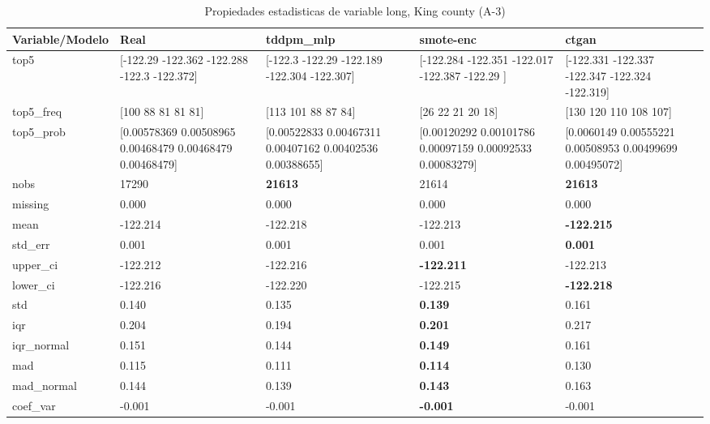 \begin{table}[H]
\centering
\fontsize{8}{14}\selectfont
\caption{Propiedades  estadisticas de variable long, King county (A-3)}
\label{table-stats-king county-a-3-long}
\begin{tabular}{|l|m{10em}|m{10em}|m{10em}|m{10em}|}
\hline
 \rowcolor[gray]{0.8}
Variable/Modelo & Real & tddpm\_mlp & smote-enc & ctgan \\
\hline top5 & [-122.29  -122.362 -122.288 -122.3   -122.372] & [-122.3   -122.29  -122.189 -122.304 -122.307] & [-122.284 -122.351 -122.017 -122.387 -122.29 ] & [-122.331 -122.337 -122.347 -122.324 -122.319] \\
\hline top5\_freq & [100  88  81  81  81] & [113 101  88  87  84] & [26 22 21 20 18] & [130 120 110 108 107] \\
\hline top5\_prob & [0.00578369 0.00508965 0.00468479 0.00468479 0.00468479] & [0.00522833 0.00467311 0.00407162 0.00402536 0.00388655] & [0.00120292 0.00101786 0.00097159 0.00092533 0.00083279] & [0.0060149  0.00555221 0.00508953 0.00499699 0.00495072] \\
\hline nobs & 17290 & \bfseries 21613 & \cellcolor[rgb]{0.9, 0.54, 0.52} 21614 & \bfseries 21613 \\
\hline missing & 0.000 & 0.000 & 0.000 & 0.000 \\
\hline mean & -122.214 & \cellcolor[rgb]{0.9, 0.54, 0.52} -122.218 & -122.213 & \bfseries -122.215 \\
\hline std\_err & 0.001 & \cellcolor[rgb]{0.9, 0.54, 0.52} 0.001 & 0.001 & \bfseries 0.001 \\
\hline upper\_ci & -122.212 & \cellcolor[rgb]{0.9, 0.54, 0.52} -122.216 & \bfseries -122.211 & -122.213 \\
\hline lower\_ci & -122.216 & \cellcolor[rgb]{0.9, 0.54, 0.52} -122.220 & -122.215 & \bfseries -122.218 \\
\hline std & 0.140 & 0.135 & \bfseries 0.139 & \cellcolor[rgb]{0.9, 0.54, 0.52} 0.161 \\
\hline iqr & 0.204 & 0.194 & \bfseries 0.201 & \cellcolor[rgb]{0.9, 0.54, 0.52} 0.217 \\
\hline iqr\_normal & 0.151 & 0.144 & \bfseries 0.149 & \cellcolor[rgb]{0.9, 0.54, 0.52} 0.161 \\
\hline mad & 0.115 & 0.111 & \bfseries 0.114 & \cellcolor[rgb]{0.9, 0.54, 0.52} 0.130 \\
\hline mad\_normal & 0.144 & 0.139 & \bfseries 0.143 & \cellcolor[rgb]{0.9, 0.54, 0.52} 0.163 \\
\hline coef\_var & -0.001 & -0.001 & \bfseries -0.001 & \cellcolor[rgb]{0.9, 0.54, 0.52} -0.001 \\

\end{tabular}
\end{table}
